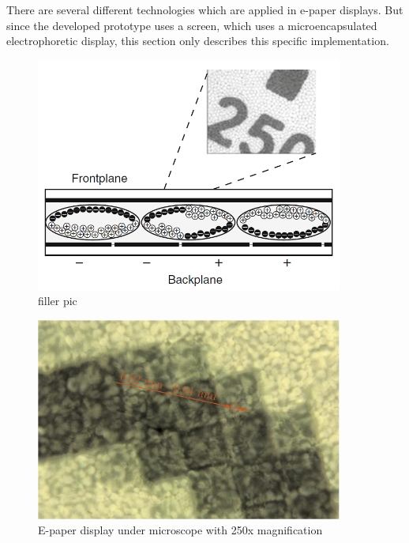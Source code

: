 There are several different technologies which are applied in e-paper displays.
But since the developed prototype uses a screen, which uses a microencapsulated electrophoretic display, this section only describes this specific implementation.


\begin{figure}[h]
	\centering
	\includegraphics[width=0.9\textwidth]{2-theory/e-paper-display/graphics/capsules.png}
	\caption{filler pic\label{theory:capsules}}
\end{figure}

\begin{figure}[h]
	\centering
	\includegraphics[width=0.9\textwidth]{2-theory/e-paper-display/graphics/epaper_mikroskop.pdf}
	\caption{E-paper display under microscope with 250x magnification\label{theory:micro}}
\end{figure}


\cite{amundson}